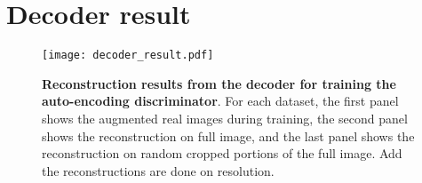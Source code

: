 \documentclass{article} \usepackage{iclr2021_conference,times}
\begin{document}
\section{Decoder result}

\begin{figure}[h]
\vspace{-2mm}
\centering
\texttt{[image: decoder\_result.pdf]}
\caption{\textbf{Reconstruction results from the decoder for training the auto-encoding discriminator}. For each dataset, the first panel shows the augmented real images during training, the second panel shows the reconstruction on full image, and the last panel shows the reconstruction on random cropped portions of the full image. Add the reconstructions are done on  resolution. }
\label{fig:decoder_recon}
\end{figure}
\end{document}
